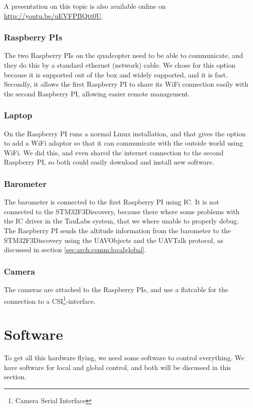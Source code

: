\documentclass[11pt, a4paper, onecolumn, oneside, parskip=half]{scrartcl}
\begin{document}
A presentation on this topic is also available online on \url{http://youtu.be/uEVFPBQtt0U}.

\subsubsection{Raspberry PIs}
\label{sec:arch:comm:raspi}
The two Raspberry PIs on the quadcopter need to be able to communicate, and they do this by a standard ethernet (network) cable. We chose for this option because it is supported out of the box and widely supported, and it is fast. Secondly, it allows the first Raspberry PI to share its WiFi connection easily with the second Raspberry PI, allowing easier remote management.

\subsubsection{Laptop}
\label{sec:arch:comm:laptop}
On the Raspberry PI runs a normal Linux installation, and that gives the option to add a WiFi adaptor so that it can communicate with the outside world using WiFi. We did this, and even shared the internet connection to the second Raspberry PI, so both could easily download and install new software.

\subsubsection{Barometer}
\label{sec:arch:comm:barometer}
The barometer is connected to the first Raspberry PI using I\texttwosuperior C. It is not connected to the STM32F3Discovery, because there where some problems with the I\texttwosuperior C driver in the TauLabs system, that we where unable to properly debug. The Raspberry PI sends the altitude information from the barometer to the STM32F3Discovery using the UAVObjects and the UAVTalk protocol, as discussed in section \ref{sec:arch:comm:localglobal}.

\subsubsection{Camera}
\label{sec:arch:comm:camera}
The cameras are attached to the Raspberry PIs, and use a flatcable for the connection to a CSI\footnote{Camera Serial Interface}-interface.

\section{Software}
\label{sec:software}
To get all this hardware flying, we need some software to control everything. We have software for local and global control, and both will be discussed in this section.
\end{document}
